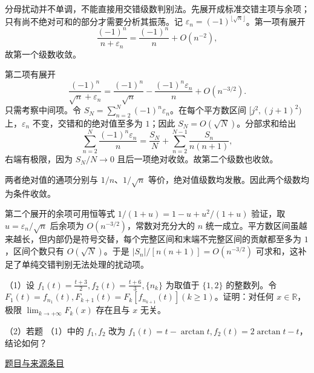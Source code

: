 \documentclass[UTF8,12pt,a4paper,fontset=fandol]{ctexart}
\begin{document}
\begin{solve}\label{ans:ch02-16th-A:5}

分母扰动并不单调，不能直接用交错级数判别法。先展开成标准交错主项与余项；只有尚不绝对可和的部分才需要分析其振荡。记 $\varepsilon_n=(-1)^{\lfloor\sqrt n\rfloor}$。第一项有展开
\[
\frac{(-1)^n}{n+\varepsilon_n}
=\frac{(-1)^n}{n}+O(n^{-2}),
\]
故第一个级数收敛。

第二项有展开
\[
\frac{(-1)^n}{\sqrt n+\varepsilon_n}
=\frac{(-1)^n}{\sqrt n}
-\frac{(-1)^n\varepsilon_n}{n}+O(n^{-3/2}).
\]
只需考察中间项。令 $S_N=\sum_{n=2}^N(-1)^n\varepsilon_n$。在每个平方数区间 $[j^2,(j+1)^2)$ 上，$\varepsilon_n$ 不变，交错和的绝对值至多为 $1$；因此 $S_N=O(\sqrt N)$。分部求和给出
\[
\sum_{n=2}^N\frac{(-1)^n\varepsilon_n}{n}
=\frac{S_N}{N}+\sum_{n=2}^{N-1}\frac{S_n}{n(n+1)},
\]
右端有极限，因为 $S_N/N\to0$ 且后一项绝对收敛。故第二个级数也收敛。

两者绝对值的通项分别与 $1/n$、$1/\sqrt n$ 等价，绝对值级数均发散。因此两个级数均为条件收敛。

第二个展开的余项可用恒等式 $1/(1+u)=1-u+u^2/(1+u)$ 验证，取 $u=\varepsilon_n/\sqrt n$ 后余项为 $O(n^{-3/2})$，常数对充分大的 $n$ 统一成立。平方数区间虽越来越长，但内部仍是符号交替，每个完整区间和末端不完整区间的贡献都至多为 $1$，区间个数只有 $O(\sqrt N)$。于是 $|S_n|/[n(n+1)]=O(n^{-3/2})$ 可求和，这补足了单纯交错判别无法处理的扰动项。

\end{solve}

\begin{example}[来源序号6]\label{ex:ch02-16th-A:6}\label{pr:ch02-16th-A:6}

（1）设 $f_{1}(t)=\frac{t+3}{2}, f_{2}(t)=\frac{t+6}{3}, \{n_{k}\}$ 为取值于 $\{1,2\}$ 的整数列。令 $F_{1}(t)=f_{n_{1}}(t), F_{k+1}(t)=F_{k}[f_{n_{k+1}}(t)] (k \geq 1)$。证明：对任何 $x \in \mathbb{R}$，极限 $\lim_{k \to +\infty} F_{k}(x)$ 存在且与 $x$ 无关。

（2）若题 （1）中的 $f_{1}, f_{2}$ 改为 $f_{1}(t)=t-\arctan t, f_{2}(t)=2 \arctan t-t$，结论如何？

\par\href{https://github.com/lzxcr/cmc-mathematics/blob/64916fa1fdbc3e444a652eca204d5669058ee321/src/problems/preliminary/16/06.md}{题目与来源条目}

\end{example}
\end{document}
